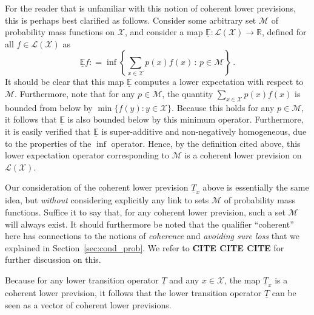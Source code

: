 \documentclass[10pt,a4paper]{paper}
\theoremstyle{definition}
\newcommand{\reals}{\mathbb{R}}
\newcommand{\states}{\mathcal{X}}
\newcommand{\lt}{\underline{T}}
\newcommand{\gambles}{\mathcal{L}}
\newcommand{\gamblesX}{\gambles(\states)}
\newcommand{\coloneqq}{:\!=}
\begin{document}
For the reader that is unfamiliar with this notion of coherent lower previsions, this is perhaps best clarified as follows. Consider some arbitrary set $\mathcal{M}$ of probability mass functions on $\states$, and consider a map $\underline{\mathbb{E}}:\gamblesX\to\reals$, defined for all $f\in\gamblesX$ as
\begin{equation*}
\underline{\mathbb{E}}f \coloneqq \inf\left\{\sum_{x\in\states} p(x)f(x)\,:\,p\in\mathcal{M}\right\}\,.
\end{equation*}
It should be clear that this map $\underline{\mathbb{E}}$ computes a lower expectation with respect to $\mathcal{M}$. Furthermore, note that for any $p\in\mathcal{M}$, the quantity $\sum_{x\in\states}p(x)f(x)$ is bounded from below by $\min\{f(y):y\in\states\}$. Because this holds for any $p\in\mathcal{M}$, it follows that $\underline{\mathbb{E}}$ is also bounded below by this minimum operator. Furthermore, it is easily verified that $\underline{\mathbb{E}}$ is super-additive and non-negatively homogeneous, due to the properties of the $\inf$ operator. Hence, by the definition cited above, this lower expectation operator corresponding to $\mathcal{M}$ is a coherent lower prevision on $\gamblesX$. 

Our consideration of the coherent lower prevision $\lt_x$  above is essentially the same idea, but \emph{without} considering explicitly any link to sets $\mathcal{M}$ of probability mass functions. Suffice it to say that, for any coherent lower prevision, such a set $\mathcal{M}$ will always exist. It should furthermore be noted that the qualifier ``coherent'' here has connections to the notions of \emph{coherence} and \emph{avoiding sure loss} that we explained in Section~\ref{sec:cond_prob}. We refer to {\bf CITE CITE CITE} for further discussion on this.

Because for any lower transition operator $\lt$ and any $x\in\states$, the map $\lt_x$ is a coherent lower prevision, it follows that the lower transition operator $\lt$ can be seen as a vector of coherent lower previsions. 
\end{document}
